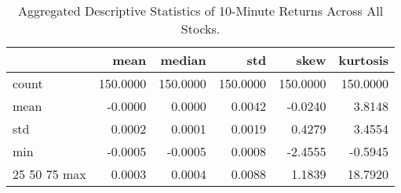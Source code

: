 \begin{table}[ht]
\caption{Aggregated Descriptive Statistics of 10-Minute Returns Across All Stocks.}
\label{tab:agg_stats}
\begin{tabular}{lrrrrr}
\toprule
 & mean & median & std & skew & kurtosis \\
\midrule
count & 150.0000 & 150.0000 & 150.0000 & 150.0000 & 150.0000 \\
mean & -0.0000 & 0.0000 & 0.0042 & -0.0240 & 3.8148 \\
std & 0.0002 & 0.0001 & 0.0019 & 0.4279 & 3.4554 \\
min & -0.0005 & -0.0005 & 0.0008 & -2.4555 & -0.5945 \\
25%
50%
75%
max & 0.0003 & 0.0004 & 0.0088 & 1.1839 & 18.7920 \\
\bottomrule
\end{tabular}
\end{table}
